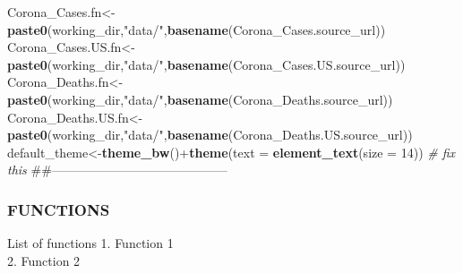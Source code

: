 \documentclass[]{article}
\newenvironment{Shaded}{\begin{snugshade}}{\end{snugshade}}
\newcommand{\KeywordTok}[1]{\textcolor[rgb]{0.13,0.29,0.53}{\textbf{{#1}}}}
\newcommand{\DataTypeTok}[1]{\textcolor[rgb]{0.13,0.29,0.53}{{#1}}}
\newcommand{\DecValTok}[1]{\textcolor[rgb]{0.00,0.00,0.81}{{#1}}}
\newcommand{\StringTok}[1]{\textcolor[rgb]{0.31,0.60,0.02}{{#1}}}
\newcommand{\CommentTok}[1]{\textcolor[rgb]{0.56,0.35,0.01}{\textit{{#1}}}}
\newcommand{\NormalTok}[1]{{#1}}
\begin{document}
\begin{Shaded}
\begin{Highlighting}[]
\NormalTok{Corona_Cases.fn<-}\KeywordTok{paste0}\NormalTok{(working_dir,}\StringTok{"data/"}\NormalTok{,}\KeywordTok{basename}\NormalTok{(Corona_Cases.source_url))}
\NormalTok{Corona_Cases.US.fn<-}\KeywordTok{paste0}\NormalTok{(working_dir,}\StringTok{"data/"}\NormalTok{,}\KeywordTok{basename}\NormalTok{(Corona_Cases.US.source_url))}
\NormalTok{Corona_Deaths.fn<-}\KeywordTok{paste0}\NormalTok{(working_dir,}\StringTok{"data/"}\NormalTok{,}\KeywordTok{basename}\NormalTok{(Corona_Deaths.source_url))}
\NormalTok{Corona_Deaths.US.fn<-}\KeywordTok{paste0}\NormalTok{(working_dir,}\StringTok{"data/"}\NormalTok{,}\KeywordTok{basename}\NormalTok{(Corona_Deaths.US.source_url))}
\NormalTok{default_theme<-}\KeywordTok{theme_bw}\NormalTok{()+}\KeywordTok{theme}\NormalTok{(}\DataTypeTok{text =} \KeywordTok{element_text}\NormalTok{(}\DataTypeTok{size =} \DecValTok{14}\NormalTok{)) }\CommentTok{# fix this}
\NormalTok{##------------------------------------------}
\end{Highlighting}
\end{Shaded}

\subsubsection{FUNCTIONS}\label{functions}

List of functions 1. Function 1\\
2. Function 2
\end{document}
